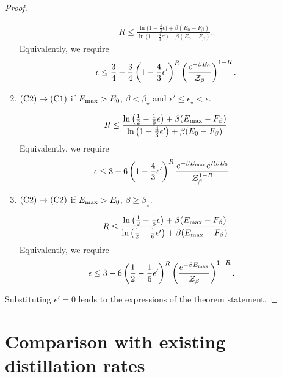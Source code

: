 \documentclass[pra,
aps,
twocolumn,
superscriptaddress,
groupedaddress,
nofootinbib,
reprint
]{revtex4-1}
\begin{document}
\begin{proof}
\begin{enumerate}
\begin{align}
	R \leq \frac{\ln{\big( 1-\frac{4}{3}\epsilon \big)} + \beta (E_0 - F_\beta)}{\ln{\big( 1-\frac{4}{3}\epsilon' \big)} + \beta (E_0 - F_\beta)}.
\end{align}
Equivalently, we require
\begin{align}
	\epsilon \leq \frac{3}{4} - \frac{3}{4} \left( 1 - \frac{4}{3}\epsilon' \right)^{R} \left( \frac{e^{-\beta E_0}}{\mathcal{Z}_\beta} \right)^{1 - R}	.
\end{align}
	
	\item $\rm{(C2)} \rightarrow \rm{(C1)}$ if $E_{\rm{max}} > E_0$, $\beta < \beta_{\star}$ and $\epsilon' \leq \epsilon_{\star} < \epsilon$.
	
\begin{align}
	R \leq \frac{\ln{\big( \frac{1}{2}-\frac{1}{6}\epsilon \big)} + \beta (E_{\rm{max}} - F_\beta)}{\ln{\big( 1-\frac{4}{3}\epsilon' \big)} + \beta (E_0 - F_\beta)}
\end{align}
Equivalently, we require
\begin{align}
	\epsilon &\leq 3 - 6 \left( 1 - \frac{4}{3}\epsilon' \right)^{R} \frac{e^{-\beta E_{\rm{max}}} e^{R\beta E_0}}{\mathcal{Z}_\beta^{1-R}}	
\end{align}

	\item $\rm{(C2)} \rightarrow \rm{(C2)}$ if $E_{\rm{max}} > E_0$, $\beta \geq \beta_{\star}$.
	
\begin{align}
	R \leq \frac{\ln{\big( \frac{1}{2}-\frac{1}{6}\epsilon \big)} + \beta (E_{\rm{max}} - F_\beta)}{\ln{\big( \frac{1}{2}-\frac{1}{6}\epsilon' \big)} + \beta (E_{\rm{max}} - F_\beta)}
\end{align}
Equivalently, we require
\begin{align}
	\epsilon &\leq 3 - 6 \left( \frac{1}{2} - \frac{1}{6}\epsilon' \right)^{R} \left( \frac{e^{-\beta E_{\rm{max}}}}{\mathcal{Z}_\beta} \right)^{1 - R}.
\end{align}
\end{enumerate}

Substituting $\epsilon' = 0$ leads to the expressions of the theorem statement.

\end{proof}

\null\newpage
\section{Comparison with existing distillation rates}
\label{sec:comparison}
\end{document}
